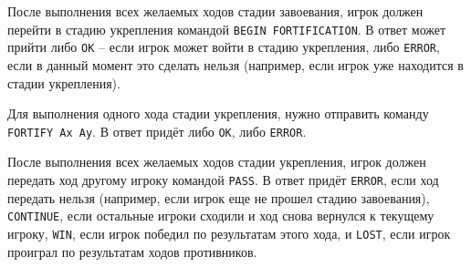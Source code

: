 \documentclass[12pt, a4paper]{article}
\begin{document}
После выполнения всех желаемых ходов стадии завоевания, игрок должен перейти в стадию укрепления командой \texttt{BEGIN FORTIFICATION}. В ответ может прийти либо \texttt{OK} -- если игрок может войти в стадию укрепления, либо \texttt{ERROR}, если в данный момент это сделать нельзя (например, если игрок уже находится в стадии укрепления).

Для выполнения одного хода стадии укрепления, нужно отправить команду \texttt{FORTIFY Ax Ay}. В ответ придёт либо \texttt{OK}, либо \texttt{ERROR}.

После выполнения всех желаемых ходов стадии укрепления, игрок должен передать ход другому игроку командой \texttt{PASS}. В ответ придёт \texttt{ERROR}, если ход передать нельзя (например, если игрок еще не прошел стадию завоевания), \texttt{CONTINUE}, если остальные игроки сходили и ход снова вернулся к текущему игроку, \texttt{WIN}, если игрок победил по результатам этого хода, и \texttt{LOST}, если игрок проиграл по результатам ходов противников.
\end{document}
